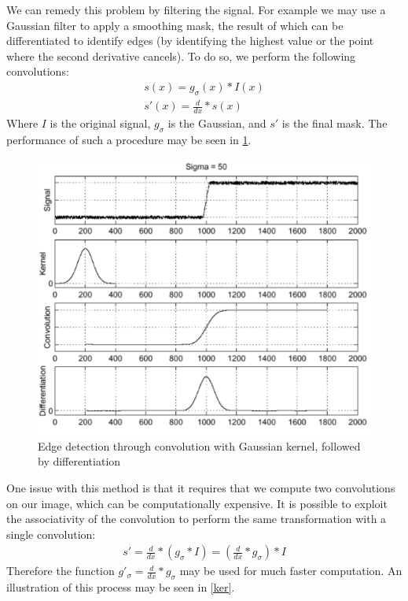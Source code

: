 \documentclass[twoside]{article}
\begin{document}
We can remedy this problem by filtering the signal. For example we may use a Gaussian filter to apply a smoothing mask, the result of which can be differentiated to identify edges (by identifying the highest value or the point where the second derivative cancels). To do so, we perform the following convolutions:
\begin{gather*}
s(x)=g_\sigma(x) * I(x)\\
s'(x)=\frac{d}{dx} * s(x)
\end{gather*}
Where $I$ is the original signal, $g_\sigma$ is the Gaussian, and $s'$ is the final mask. The performance of such a procedure may be seen in \ref{gauss}.

\begin{figure}[h]
  \centering
  \includegraphics[scale=.4]{gaussian.PNG}
    \caption{Edge detection through convolution with Gaussian kernel, followed by differentiation}
    \label{gauss}
\end{figure}

One issue with this method is that it requires that we compute two convolutions on our image, which can be computationally expensive. It is possible to exploit the associativity of the convolution to perform the same transformation with a single convolution:
\begin{gather*}
s'=\frac{d}{dx} * (g_\sigma * I)=(\frac{d}{dx} * g_\sigma) * I
\end{gather*}
Therefore the function $g'_\sigma=\frac{d}{dx} * g_\sigma$ may be used for much faster computation. An illustration of this process may be seen in \ref{ker}.
\end{document}
